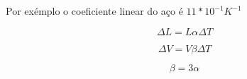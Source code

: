 \documentclass[12pt]{article}
\begin{document}
Por ex{\' e}mplo o coeficiente linear do a{\c c}o {\' e} $11*10^{-1} K^{-1}$

\begin{equation}
\Delta L = L \alpha \Delta T
\end{equation}

\begin{equation}
\Delta V = V \beta \Delta T
\end{equation}

\begin{equation}
\beta = 3 \alpha
\end{equation}
\end{document}
